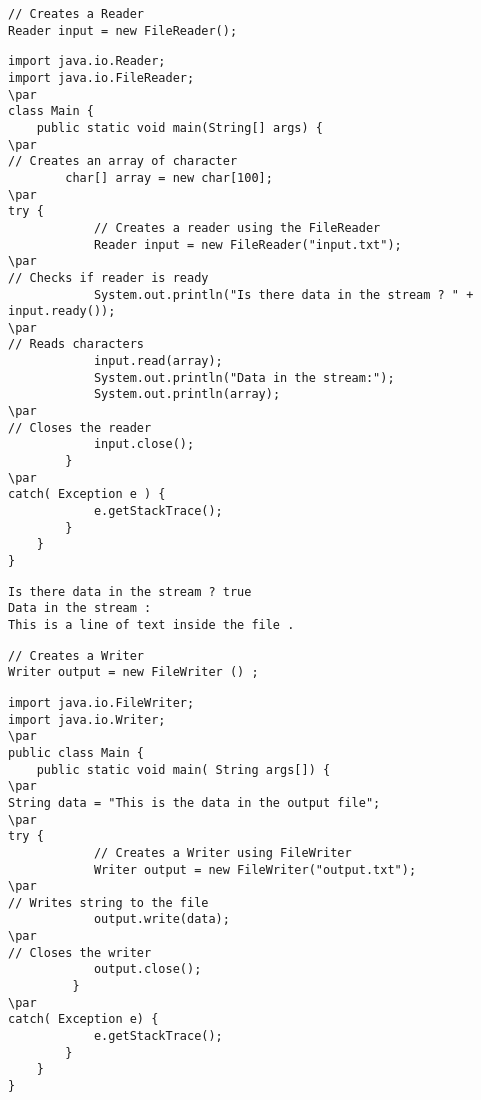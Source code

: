 \documentclass{book}
\def\lthtmlcheckvsize{\ifdim\ht\sizebox<\vsize 
  \ifdim\wd\sizebox<\hsize\expandafter\hfill\fi \expandafter\vfill
  \else\expandafter\vss\fi}%
\begin{document}
{\newpage\clearpage
{}%
\begin{lstlisting}
// Creates a Reader
Reader input = new FileReader();
\end{lstlisting}%
\lthtmlfigureZ
\lthtmlcheckvsize\clearpage}

{\newpage\clearpage
{}%
\begin{lstlisting}
import java.io.Reader;
import java.io.FileReader;
\par
class Main {
	public static void main(String[] args) {
\par
// Creates an array of character
		char[] array = new char[100];
\par
try {
			// Creates a reader using the FileReader
			Reader input = new FileReader("input.txt");
\par
// Checks if reader is ready
			System.out.println("Is there data in the stream ? " + input.ready());
\par
// Reads characters
			input.read(array);
			System.out.println("Data in the stream:");
			System.out.println(array);
\par
// Closes the reader
			input.close();
		}
\par
catch( Exception e ) {
			e.getStackTrace();
		}
	}
}
\end{lstlisting}%
\lthtmlfigureZ
\lthtmlcheckvsize\clearpage}

{\newpage\clearpage
{}%
\begin{lstlisting}
Is there data in the stream ? true
Data in the stream :
This is a line of text inside the file .
\end{lstlisting}%
\lthtmlfigureZ
\lthtmlcheckvsize\clearpage}

{\newpage\clearpage
{}%
\begin{lstlisting}
// Creates a Writer
Writer output = new FileWriter () ;
\end{lstlisting}%
\lthtmlfigureZ
\lthtmlcheckvsize\clearpage}

{\newpage\clearpage
{}%
\begin{lstlisting}
import java.io.FileWriter;
import java.io.Writer;
\par
public class Main {
	public static void main( String args[]) {
\par
String data = "This is the data in the output file";
\par
try {
			// Creates a Writer using FileWriter
			Writer output = new FileWriter("output.txt");
\par
// Writes string to the file
			output.write(data);
\par
// Closes the writer
			output.close();
		 }
\par
catch( Exception e) {
			e.getStackTrace();
		}
	}
}
\end{lstlisting}%
\lthtmlfigureZ
\lthtmlcheckvsize\clearpage}
\end{document}

